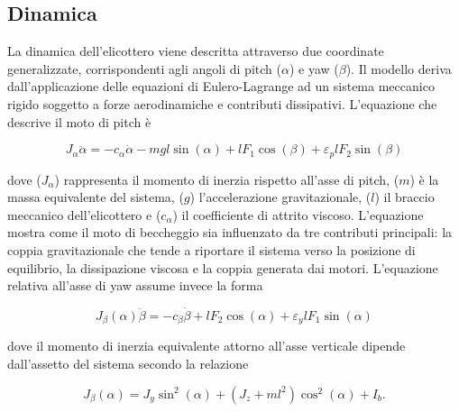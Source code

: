 \documentclass[12pt,a4paper]{article}
\newcommand{\placeholder}[1]{\textit{#1}}
\begin{document}



\subsection{Dinamica}
La dinamica dell'elicottero viene descritta attraverso due coordinate generalizzate, corrispondenti agli angoli di pitch ($\alpha$) e yaw ($\beta$). Il modello deriva dall'applicazione delle equazioni di Eulero-Lagrange ad un sistema meccanico rigido soggetto a forze aerodinamiche e contributi dissipativi.
L'equazione che descrive il moto di pitch è

\begin{equation}
J_{\alpha}\ddot{\alpha} = - c_{\alpha}\dot{\alpha} - mgl\sin(\alpha) + lF_1\cos(\beta) + \varepsilon_p lF_2\sin(\beta)
\end{equation}

dove ($J_{\alpha}$) rappresenta il momento di inerzia rispetto all'asse di pitch, ($m$) è la massa equivalente del sistema, ($g$) l'accelerazione gravitazionale, ($l$) il braccio meccanico dell'elicottero e ($c_{\alpha}$) il coefficiente di attrito viscoso.
L'equazione mostra come il moto di beccheggio sia influenzato da tre contributi principali: la coppia gravitazionale che tende a riportare il sistema verso la posizione di equilibrio, la dissipazione viscosa e la coppia generata dai motori.
L'equazione relativa all'asse di yaw assume invece la forma

\begin{equation}
J_{\beta}(\alpha)\ddot{\beta} = - c_{\beta}\dot{\beta} + lF_2\cos(\alpha) + \varepsilon_y lF_1\sin(\alpha)
\end{equation}

dove il momento di inerzia equivalente attorno all'asse verticale dipende dall'assetto del sistema secondo la relazione

\begin{equation}
J_{\beta}(\alpha) = J_y\sin^2(\alpha) + \left(J_z+ml^2\right)\cos^2(\alpha) + I_b.
\end{equation}
\end{document}
